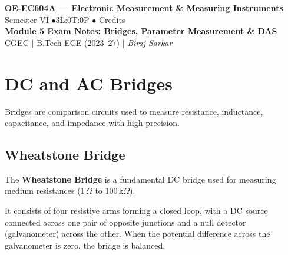 \documentclass[12pt,a4paper]{article}
\begin{document}

\begin{center}
  {\LARGE\bfseries\color{myred} OE-EC604A --- Electronic Measurement \& Measuring Instruments}\\[5pt]
  {\normalsize\color{mydark} Semester VI \quad$\bullet$\quad 3L:0T:0P \quad$\bullet$ Credits}\\[3pt]
  {\normalsize\color{myteal}\textbf{Module 5 Exam Notes: Bridges, Parameter Measurement \& DAS}}\\[3pt]
  {\small\color{mydark} CGEC \;$|$\; B.Tech ECE (2023--27) \;$|$\; \textit{Biraj Sarkar}}
\end{center}
\vspace{2pt}
\noindent{\color{myred}\rule{\linewidth}{1.5pt}}
\vspace{2pt}

\hypersetup{linkcolor=mydark}
\tableofcontents
\hypersetup{linkcolor=myteal}
\newpage

\section{DC and AC Bridges}

Bridges are comparison circuits used to measure resistance, inductance, capacitance, and impedance with high precision.

\subsection{Wheatstone Bridge}
The \textbf{Wheatstone Bridge} is a fundamental DC bridge used for measuring medium resistances ($1\,\Omega$ to $100\,\text{k}\Omega$).

\begin{tcolorbox}[defbox, title={\textbf{Wheatstone Bridge Principle}}]
It consists of four resistive arms forming a closed loop, with a DC source connected across one pair of opposite junctions and a null detector (galvanometer) across the other. When the potential difference across the galvanometer is zero, the bridge is balanced.
\end{tcolorbox}
\end{document}
